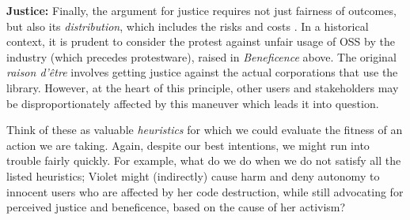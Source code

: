 \documentclass[journal,twocolumn]{IEEEtran}
\begin{document}
\textbf{Justice:}
Finally, the argument for justice requires not just fairness of outcomes, but also its \textit{distribution}, which includes the risks and costs \cite{Beauchamp1994}. 
In a historical context, it is prudent to consider the protest against unfair usage of OSS by the industry (which precedes protestware), raised in \textit{Beneficence} above. The original \textit{raison d'\^{e}tre} involves getting justice against the actual corporations that use the library. However, at the heart of this principle, other users and stakeholders may be disproportionately affected by this maneuver which leads it into question. 

\vspace{8pt}
Think of these as valuable \textit{heuristics} for which we could evaluate the fitness of an action we are taking. Again, despite our best intentions, we might run into trouble fairly quickly. For example, what do we do when we do not satisfy all the listed heuristics; Violet might (indirectly) cause harm and deny autonomy to innocent users who are affected by her code destruction, while still advocating for perceived justice and  beneficence, based on the cause of her activism?





\end{document}
